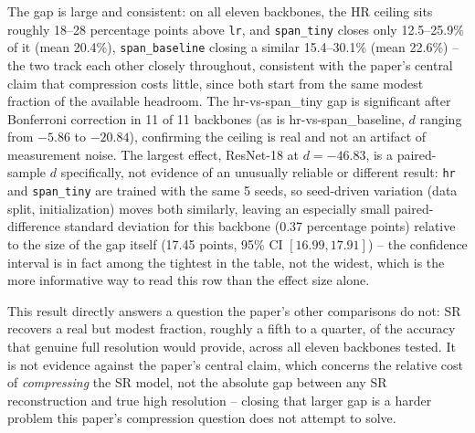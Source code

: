 \documentclass[11pt]{article}
\begin{document}
The gap is large and consistent: on all eleven backbones, the HR ceiling sits roughly 18--28 percentage points above \texttt{lr}, and \texttt{span\_tiny} closes only 12.5--25.9\% of it (mean 20.4\%), \texttt{span\_baseline} closing a similar 15.4--30.1\% (mean 22.6\%) -- the two track each other closely throughout, consistent with the paper's central claim that compression costs little, since both start from the same modest fraction of the available headroom. The hr-vs-span\_tiny gap is significant after Bonferroni correction in 11 of 11 backbones (as is hr-vs-span\_baseline, $d$ ranging from $-5.86$ to $-20.84$), confirming the ceiling is real and not an artifact of measurement noise. The largest effect, ResNet-18 at $d{=}{-}46.83$, is a paired-sample $d$ specifically, not evidence of an unusually reliable or different result: \texttt{hr} and \texttt{span\_tiny} are trained with the same 5 seeds, so seed-driven variation (data split, initialization) moves both similarly, leaving an especially small paired-difference standard deviation for this backbone (0.37 percentage points) relative to the size of the gap itself (17.45 points, 95\% CI $[16.99, 17.91]$) -- the confidence interval is in fact among the tightest in the table, not the widest, which is the more informative way to read this row than the effect size alone.

This result directly answers a question the paper's other comparisons do not: SR recovers a real but modest fraction, roughly a fifth to a quarter, of the accuracy that genuine full resolution would provide, across all eleven backbones tested. It is not evidence against the paper's central claim, which concerns the relative cost of \emph{compressing} the SR model, not the absolute gap between any SR reconstruction and true high resolution -- closing that larger gap is a harder problem this paper's compression question does not attempt to solve.
\end{document}

